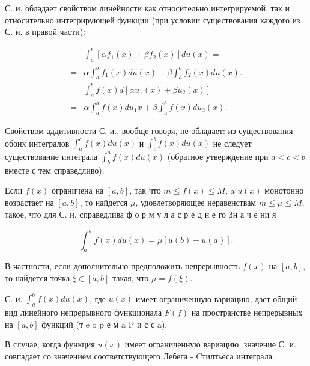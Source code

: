 \documentclass[10pt]{article}
\begin{document}
С. и. обладает свойством линейности как относительно интегрируемой, так и относительно интегрирующей функции (при условии существования каждого из С. и. в правой части):



\[

\begin{aligned}

& \int_{a}^{b}\left[\alpha f_{1}(x)+\beta f_{2}(x)\right] d u(x)= \\

= & \alpha \int_{a}^{b} f_{1}(x) d u(x)+\beta \int_{a}^{b} f_{2}(x) d u(x) . \\

& \int_{a}^{b} f(x) d\left[\alpha u_{1}(x)+\beta u_{2}(x)\right]= \\

= & \alpha \int_{a}^{b} f(x) d u_{1} x+\beta \int_{a}^{b} f(x) d u_{2}(x) .

\end{aligned}

\]



Свойством аддитивности С. и., вообще говоря, не обладает: из существования обоих интегралов $\int_{a}^{c} f(x) d u(x)$ и $\int_{c}^{b} f(x) d u(x)$ не следует существование интеграла $\int_{b}^{a} f(x) d u(x)$ (обратное утверждение при $a<c<b$ вместе с тем справедливо).



Если $f(x)$ ограничена на $[a, b]$, так что $m \leqslant f(x) \leqslant M$, a $u(x)$ монотонно возрастает на $[a, b]$, то найдется $\mu$, удовлетворяющее неравенствам $m \leqslant \mu \leqslant M$, такое, что для С. и. справедлива ф о р м у л а с р е д н е го Зн а ч е ни я



\[

\int_{a}^{b} f(x) d u(x)=\mu[u(b)-u(a)] .

\]



В частности, если дополнительно предположить непрерывность $f(x)$ на $[a, b]$, то найдется точка $\xi \in[a, b]$ такая, что $\mu=f(\xi)$.



С. и. $\int_{a}^{b} f(x) d u(x)$, где $u(x)$ имеет ограниченную вариацию, дает общий вид линейного непрерывного функционала $F(f)$ на пространстве непрерывных на $[a, b]$ функций (т e o p е м a $\mathrm{P}$ и с с a).



В случае; когда функция $u(x)$ имеет ограниченную вариацию, значение С. и. совпадает со значением соответствующего Лебега - Cтилтьеса интеграла.
\end{document}
